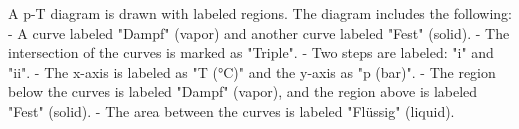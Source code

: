 A p-T diagram is drawn with labeled regions. The diagram includes the following:  
- A curve labeled "Dampf" (vapor) and another curve labeled "Fest" (solid).  
- The intersection of the curves is marked as "Triple".  
- Two steps are labeled: "i" and "ii".  
- The x-axis is labeled as "T (°C)" and the y-axis as "p (bar)".  
- The region below the curves is labeled "Dampf" (vapor), and the region above is labeled "Fest" (solid).  
- The area between the curves is labeled "Flüssig" (liquid).
